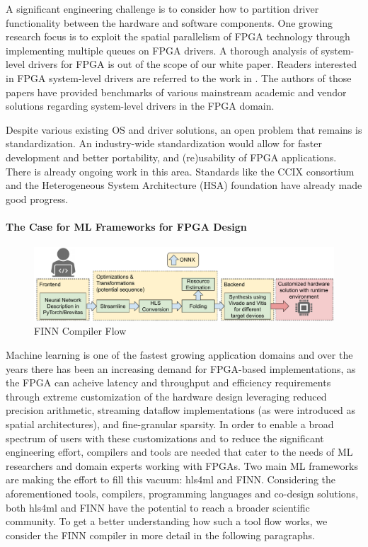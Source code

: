 A significant engineering challenge is to consider how to partition driver functionality between the hardware and software components. One growing research focus is to exploit the spatial parallelism of FPGA technology through implementing multiple queues on FPGA drivers. A thorough analysis of system-level drivers for FPGA is out of the scope of our white paper. Readers interested in FPGA system-level drivers are referred to the work in \cite{fpga_drivers, fpgadrivers2}. The authors of those papers have provided benchmarks of various mainstream academic and vendor solutions regarding system-level drivers in the FPGA domain. 

Despite various existing OS and driver solutions, an open problem that remains is standardization. An industry-wide standardization would allow for faster development and better portability, and (re)usability of FPGA applications. There is already ongoing work in this area. Standards like the CCIX consortium \cite{ccix} and the Heterogeneous System Architecture (HSA) foundation \cite{hsa}  have already made good progress.

\paragraph*{The Case for ML Frameworks for FPGA Design}

\begin{figure}
\centering
\includegraphics[width=0.8\linewidth]{figures/FINN_flow_for_paper.pdf}  
\caption{FINN Compiler Flow}\label{figures:finnflow}
\end{figure}

Machine learning is one of the fastest growing application domains and over the years there has been an increasing demand for FPGA-based implementations, as the FPGA can acheive latency and throughput and efficiency requirements through extreme customization of the hardware design leveraging reduced precision arithmetic, streaming dataflow implementations (as were introduced as spatial architectures), and fine-granular sparsity.  In order to enable a broad spectrum of users with these customizations and to reduce the significant engineering effort, compilers and tools are needed that cater to the needs of ML researchers and domain experts working with FPGAs. Two main ML frameworks are making the effort to fill this vacuum: hls4ml and FINN. Considering the aforementioned tools, compilers, programming languages and co-design solutions, both hls4ml and FINN have the potential to reach a broader scientific community. 
To get a better understanding how such a tool flow works, we consider the FINN compiler in more detail in the following paragraphs.



